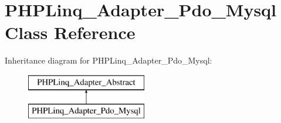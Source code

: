 \hypertarget{class_p_h_p_linq___adapter___pdo___mysql}{\section{\-P\-H\-P\-Linq\-\_\-\-Adapter\-\_\-\-Pdo\-\_\-\-Mysql \-Class \-Reference}
\label{class_p_h_p_linq___adapter___pdo___mysql}
}
\-Inheritance diagram for \-P\-H\-P\-Linq\-\_\-\-Adapter\-\_\-\-Pdo\-\_\-\-Mysql\-:\begin{figure}[H]
\begin{center}
\leavevmode
\includegraphics[height=2.000000cm]{class_p_h_p_linq___adapter___pdo___mysql}
\end{center}
\end{figure}
